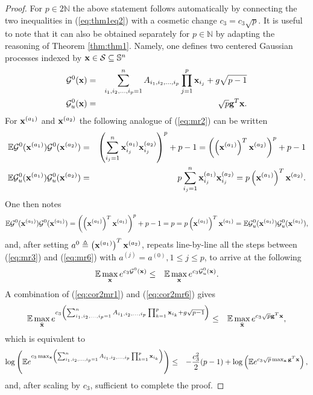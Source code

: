 \documentclass[10pt]{article}
\def\x{{\bf x}}
\def\x{{\mathbf x}}
\def\x{{\bf x}}
\def\x{{\bf x}}
\def\g{{\bf g}}
\def\mN{{\mathbb N}}
\def\mE{{\mathbb E}}
\def\mS{{\mathbb S}}
\def\lp{\left (}
\def\rp{\right )}
\def\x{{\bf x}}
\def\x{{\mathbf x}}
\def\x{{\bf x}}
\def\x{{\bf x}}
\def\g{{\bf g}}
\def\cS{{\mathcal S}}
\def\cG{{\mathcal G}}
\begin{document}
\begin{proof}
For $p\in2\mN$ the above statement follows automatically by connecting the two inequalities in (\ref{eq:thm1eq2}) with a cosmetic change $c_{3} = c_{3}\sqrt{p}$. It is useful to note that it can also be obtained separately for $p\in\mN$ by adapting the reasoning of Theorem \ref{thm:thm1}. Namely, one defines two centered Gaussian processes indexed by $\x\in\cS \subseteq \mS^n$
  \begin{eqnarray}
\label{eq:cor2mr1}
\cG^0 (\x) & = & \sum_{i_1,i_2,\dots,i_p=1}^n A_{i_1,i_2,\dots,i_p}\prod_{j=1}^{p}\x_{i_j}   + g\sqrt{p-1}  \nonumber   \\
\cG_u^0 (\x) & = &   \sqrt{p} \g^T\x .
  \end{eqnarray}
For $\x^{(a_1)}$ and $\x^{(a_2)} $ the following analogue of (\ref{eq:mr2}) can be written
  \begin{eqnarray}
\label{eq:cor2mr2}
\mE \cG^0 (\x^{(a_1)})\cG^0 (\x^{(a_2)} )   & =  & \lp  \sum_{i_j=1}^n   \x_{i_j}^{(a_1)}  \x_{i_j}^{(a_2)}  \rp^p + p-1
=  \lp \lp \x^{(a_1)} \rp^T\x^{(a_2)} \rp^p + p-1 \nonumber   \\
\mE \cG^0_u (\x^{(a_1)})\cG^0_u (\x^{(a_2)} )   & =  & p \sum_{i_j=1}^n \x_{i_j}^{(a_1)}\x_{i_j}^{(a_2)}
=
p
 \lp \x^{(a_1)} \rp^T\x^{(a_2)}.
  \end{eqnarray}
  One then notes
 \begin{eqnarray}
\label{eq:mr2a}
\mE \cG^0 (\x^{(a_1)})\cG^0 (\x^{(a_1)} )
=  \lp \lp \x^{(a_1)} \rp^T\x^{(a_1)} \rp^p  + p-1
= p = p
 \lp \x^{(a_1)} \rp^T\x^{(a_1)} =
\mE \cG^0_u (\x^{(a_1)})\cG^0_u (\x^{(a_1)} ),
  \end{eqnarray}
and, after setting $a^{0}\triangleq\lp \x^{(a_1)} \rp^T\x^{(a_2)} $, repeats line-by-line all the steps between (\ref{eq:mr3}) and  (\ref{eq:mr6}) with $a^{(j)}=a^{(0)},1\leq j\leq p$, to arrive at the following
\begin{eqnarray}
\label{eq:cor2mr6}
  \mE \max_{\x} e^{c_{3}\cG^0(\x)} &\leq &   \mE \max_{\x} e^{c_{3}\cG^0_u(\x)}.
\end{eqnarray}
A combination of (\ref{eq:cor2mr1}) and (\ref{eq:cor2mr6}) gives
\begin{eqnarray}
\label{eq:cor2mr7}
  \mE \max_{\bar{\x}} e^{c_{3}\lp \sum_{i_1,i_2,\dots,i_p=1}^n A_{i_1,i_2,\dots,i_p}\prod_{k=1}^{p}\x_{i_k}   + g\sqrt{p-1}   \rp  } &\leq &   \mE \max_{\bar{\x}} e^{c_{3} \sqrt{p} \g^T\x   },
  \end{eqnarray}
which is equivalent to
 \begin{eqnarray}
\label{eq:cor2mr9}
   \log \lp \mE e^{c_{3} \max_{\x}  \lp \sum_{i_1,i_2,\dots,i_p=1}^n A_{i_1,i_2,\dots,i_p}\prod_{k=1}^{p}\x_{i_k}    \rp  }
   \rp
   &\leq &
   -\frac{c_{3}^2}{2}(p-1) + \log \lp
    \mE e^{c_{3} \sqrt{p}  \max_{\x}  \g^T\x   }
    \rp,
\end{eqnarray}
and, after scaling by $c_3$, sufficient to complete the proof.



 \end{proof}
\end{document}
